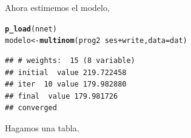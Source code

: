 \documentclass[onesided]{article}\usepackage[]{graphicx}\usepackage[]{color}
\makeatletter
\newcommand{\hlopt}[1]{\textcolor[rgb]{0,0,0}{#1}}%
\newcommand{\hlstd}[1]{\textcolor[rgb]{0.345,0.345,0.345}{#1}}%
\newcommand{\hlkwb}[1]{\textcolor[rgb]{0.69,0.353,0.396}{#1}}%
\newcommand{\hlkwc}[1]{\textcolor[rgb]{0.333,0.667,0.333}{#1}}%
\newcommand{\hlkwd}[1]{\textcolor[rgb]{0.737,0.353,0.396}{\textbf{#1}}}%
\newenvironment{kframe}{%
 \def\at@end@of@kframe{}%
 \ifinner\ifhmode%
  \def\at@end@of@kframe{\end{minipage}}%
  \begin{minipage}{\columnwidth}%
 \fi\fi%
 \def\FrameCommand##1{\hskip\@totalleftmargin \hskip-\fboxsep
 \colorbox{shadecolor}{##1}\hskip-\fboxsep
     \hskip-\linewidth \hskip-\@totalleftmargin \hskip\columnwidth}%
 \MakeFramed {\advance\hsize-\width
   \@totalleftmargin\z@ \linewidth\hsize
   \@setminipage}}%
 {\par\unskip\endMakeFramed%
 \at@end@of@kframe}
\newenvironment{knitrout}{}{} %
\makeatother
\begin{document}
Ahora estimemos el modelo,

\begin{knitrout}
\color{fgcolor}\begin{kframe}
\begin{alltt}
\hlkwd{p_load}\hlstd{(nnet)}
\hlstd{modelo} \hlkwb{<-} \hlkwd{multinom}\hlstd{(prog2} \hlopt{~} \hlstd{ses} \hlopt{+} \hlstd{write,} \hlkwc{data} \hlstd{= dat)}
\end{alltt}
\begin{verbatim}
## # weights:  15 (8 variable)
## initial  value 219.722458 
## iter  10 value 179.982880
## final  value 179.981726 
## converged
\end{verbatim}
\end{kframe}
\end{knitrout}

Hagamos una tabla.
\end{document}
